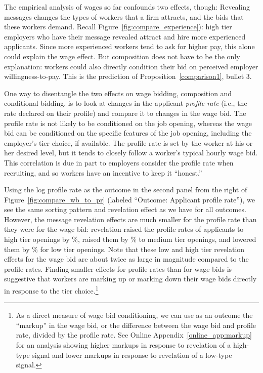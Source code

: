 \documentclass[12pt]{article}
\begin{document}
The empirical analysis of wages so far confounds two effects, though: Revealing messages changes the types of workers that a firm attracts, and the bids that these workers demand. Recall Figure~\ref{fig:compare_experience}):
high tier employers who have their message revealed attract and hire more experienced applicants. Since more experienced workers tend to ask for higher pay, this alone could explain the wage effect. But composition does not have to be the only explanation: workers could also directly condition their bid on perceived employer willingness-to-pay.
This is the prediction of Proposition~\ref{comparison1}, bullet 3. 

One way to disentangle the two effects on wage bidding, composition and conditional bidding, is to look at changes in the applicant {\em profile rate} (i.e., the rate declared on their profile) and compare it to changes in the wage bid.
The profile rate is not likely to be conditioned on the job opening, whereas the wage bid can be conditioned on the specific features of the job opening, including the employer's tier choice, if available. 
The profile rate is set by the worker at his or her desired level, but it tends to closely follow a worker's typical hourly wage bid.
This correlation is due in part to employers consider the profile rate when recruiting, and so workers have an incentive to keep it ``honest.''

Using the log profile rate as the outcome in the second panel from the right of Figure~\ref{fig:compare_wb_to_pr} (labeled ``Outcome: Applicant profile rate''), we see the same sorting pattern and revelation effect as we have for all outcomes.
However, the message revelation effects are much smaller for the profile rate than they were for the wage bid: 
revelation raised the profile rates of applicants to high tier openings by \EffectProfileRateAppHighTierRegression{}\%, raised them by \EffectProfileRateAppMedTierRegression{}\% to medium tier openings, and lowered them by \EffectProfileRateAppLowTierRegression{}\% for low tier openings.
Note that these low and high tier revelation effects for the wage bid are about twice as large in magnitude compared to the profile rates. 
Finding smaller effects for profile rates than for wage bids is suggestive that workers are marking up or marking down their wage bids directly in response to the tier choice.\footnote{
  As a direct measure of wage bid conditioning, we can use as an outcome the ``markup'' in the wage bid, or the difference between the wage bid and profile rate, divided by the profile rate.
  See Online Appendix~\ref{online_app:markup} for an analysis showing higher markups in response to revelation of a high-type signal and lower markups in response to revelation of a low-type signal.
}
\end{document}
